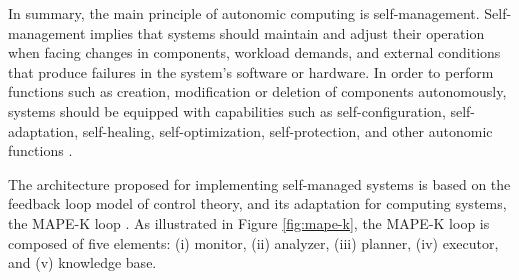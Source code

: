In summary, the main principle of autonomic computing is self-management. Self-management implies that systems should maintain and adjust their operation when facing changes in components, workload demands, and external conditions that produce failures in the system's software or hardware. In order to perform functions such as creation, modification or deletion of components autonomously, systems should be equipped with capabilities such as self-configuration, self-adaptation, self-healing, self-optimization, self-protection, and other autonomic functions \cite{autonomiccomputing}.

The architecture proposed for implementing self-managed systems is based on the feedback loop model of control theory, and its adaptation for computing systems, the MAPE-K loop \cite{villegas-et-al:2017-architecting-SwSystems-for-self-adaptation}\cite{SEFSAS3:2017:challenges-assurances}\cite{SEFSAS3:2017:what-can-control}. As illustrated in Figure \ref{fig:mape-k}, the MAPE-K loop is composed of five elements: (i) monitor, (ii) analyzer, (iii) planner, (iv) executor, and (v) knowledge base.\\


